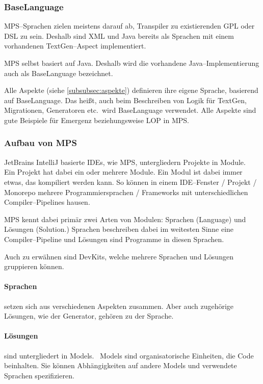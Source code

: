 \subsubsection{BaseLanguage}
\acs{MPS}--Sprachen zielen meistens darauf ab, Transpiler zu existierenden \ac{GPL} oder \ac{DSL} zu sein.
Deshalb sind \ac{XML} und Java bereits als Sprachen mit einem vorhandenen TextGen--Aspect implementiert.

\ac{MPS} selbst basiert auf Java.
Deshalb wird die vorhandene Java--Implementierung auch als BaseLanguage bezeichnet.~\autocite{jetbrains-sro-no-dateF}

Alle Aspekte (siehe \autoref{subsubsec:aspekte}) definieren ihre eigene Sprache, basierend auf BaseLanguage.
Das heißt, auch beim Beschreiben von Logik für TextGen, Migrationen, Generatoren etc.\ wird BaseLanguage verwendet.
Alle Aspekte sind gute Beispiele für Emergenz beziehungsweise \ac{LOP} in \ac{MPS}.

\subsubsection{Aufbau von \acs{MPS}}
JetBrains IntelliJ basierte \acp{IDE}, wie \ac{MPS}, untergliedern Projekte in Module.~\autocite{jetbrains-sro-no-dateD}
Ein Projekt hat dabei ein oder mehrere Module.
Ein Modul ist dabei immer etwas, das kompiliert werden kann.
So können in einem \acs{IDE}--Fenster / Projekt / Monorepo mehrere Programmiersprachen / Frameworks mit unterschiedlichen Compiler--Pipelines hausen.

\ac{MPS} kennt dabei primär zwei Arten von Modulen:
Sprachen (Language) und Lösungen (Solution.)
Sprachen beschreiben dabei im weitesten Sinne eine Compiler--Pipeline und Lösungen sind Programme in diesen Sprachen.

Auch zu erwähnen sind DevKits, welche mehrere Sprachen und Lösungen gruppieren können.

\paragraph{Sprachen} setzen sich aus verschiedenen Aspekten zusammen.
Aber auch zugehörige Lösungen, wie der Generator, gehören zu der Sprache.

\paragraph{Lösungen} sind untergliedert in Models.~\autocite{jetbrains-sro-no-dateA}
Models sind organisatorische Einheiten, die Code beinhalten.
Sie können Abhängigkeiten auf andere Models und verwendete Sprachen spezifizieren.

